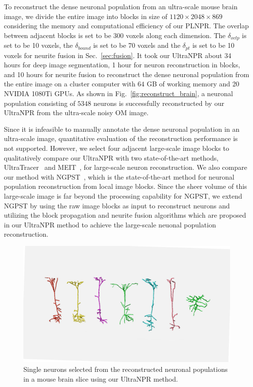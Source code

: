 To reconstruct the dense neuronal population from an ultra-scale mouse brain image, we divide the entire image into blocks in size of $1120\times 2048\times 869$ considering the memory and computational efficiency of our PLNPR.
%
The overlap between adjacent blocks is set to be $300$ voxels along each dimension. 
The $\delta_{ovlp}$ is set to be 10 voxels, the $\delta_{bound}$ is set to be 70 voxels and the $\delta_{pt}$ is set to be 10 voxels for neurite fusion in Sec.~\ref{sec:fusion}.
%
It took our UltraNPR about 34 hours for deep image segmentation, 1 hour for neuron reconstruction in blocks, and 10 hours for neurite fusion to reconstruct the dense neuronal population from the entire image on a cluster computer with $64$ GB of working memory and 20 NVIDIA 1080Ti GPUs.
%
As shown in Fig.~\ref{fig:reconstruct_brain}, a neuronal population consisting of $5348$ neurons is successfully reconstructed by our UltraNPR from the ultra-scale noisy OM image. 


Since it is infeasible to manually annotate the dense neuronal population in an ultra-scale image, quantitative evaluation of the reconstruction performance is not supported.
%
However, we select four adjacent large-scale image blocks to qualitatively compare our UltraNPR with two state-of-the-art methods, UltraTracer~\cite{Peng2017} and MEIT~\cite{Wang2018}, for large-scale neuron reconstruction.
We also compare our method with NGPST~\cite{Quan2015}, which is the state-of-the-art method for neuronal population reconstruction from local image blocks.
Since the sheer volume of this large-scale image is far beyond the processing capability for NGPST, we extend NGPST by using the raw image blocks as input to reconstruct neurons and utilizing the block propagation and neurite fusion algorithms which are proposed in our UltraNPR method to achieve the large-scale neuonal population reconstruction.
%


\begin{figure}[t]
	\centering
	\includegraphics[width=\columnwidth]{./Illustrations/single_neurons4.pdf}
	\caption{Single neurons selected from the reconstructed neuronal populations in a mouse brain slice using our UltraNPR method.}
	\label{fig:single_neurons}
\end{figure}

